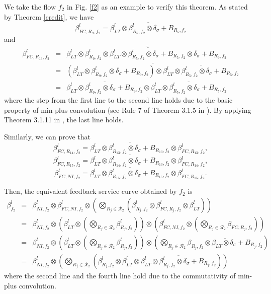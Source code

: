 \documentclass[preprint]{elsarticle}
\begin{document}
\begin{pf}
We take the flow $f_2$ in Fig. \ref{f2} as an example to verify this theorem. As stated by Theorem \ref{credit}, we have $$\beta_{FC,R_9,f_2}^l=\overline{\beta^l_{LT}\otimes\beta_{R_5,f_2}^l\otimes\delta_\sigma+B_{R_5,f_2}}$$ and
\begin{eqnarray*}
\beta_{FC,R_{13},f_2}^l&=&\overline{\beta^l_{LT}\otimes\beta^l_{R_9,f_2}\otimes\overline{\beta^l_{LT}\otimes\beta^l_{R_5,f_2}\otimes\delta_\sigma+B_{R_5,f_2}}\otimes\delta_\sigma+B_{R_9,f_2}}\label{eq1}\\
&=&\overline{(\beta^l_{LT}\otimes\beta^l_{R_9,f_2}\otimes\delta_\sigma+B_{R_9,f_2})\otimes\overline{\beta^l_{LT}\otimes\beta^l_{R_5,f_2}\otimes\delta_\sigma+B_{R_5,f_2}}}\label{eq2}\\
&=&\overline{\beta^l_{LT}\otimes\beta^l_{R_9,f_2}\otimes\delta_\sigma+B_{R_9,f_2}}\otimes\overline{\beta^l_{LT}\otimes\beta^l_{R_5,f_2}\otimes\delta_\sigma+B_{R_5,f_2}}\label{eq3}
\end{eqnarray*}
where the step from the first line to the second line holds due to the basic property of min-plus convolution (see Rule 7 of Theorem 3.1.5 in \cite{Boudec2001Network}). By applying Theorem 3.1.11 in \cite{Boudec2001Network}, the last line holds.

Similarly, we can prove that
$$\beta_{FC,R_{14},f_2}^l=\overline{\beta^l_{LT}\otimes\beta^l_{R_{13},f_2}\otimes\delta_\sigma+B_{R_{13},f_2}}\otimes\beta_{FC,R_{13},f_2}^l,$$
$$\beta_{FC,R_{15},f_2}^l=\overline{\beta^l_{LT}\otimes\beta^l_{R_{14},f_2}\otimes\delta_\sigma+B_{R_{13},f_2}}\otimes\beta_{FC,R_{14},f_2}^l,$$
$$\beta_{FC,NI,f_2}^l=\overline{\beta^l_{LT}\otimes\beta^l_{R_{15},f_2}\otimes\delta_\sigma+B_{R_{15},f_2}}\otimes\beta_{FC,R_{15},f_2}^l.$$

Then, the equivalent feedback service curve obtained by $f_2$ is
\begin{eqnarray*}
\beta_{f_2}^l&=&\beta_{NI,f_2}^l\otimes\beta_{FC,NI,f_2}^l\otimes(\underset{R_j\in\mathcal{R}_2}{\bigotimes}(\beta^l_{R_j,f_2}\otimes\beta^l_{FC,R_j,f_2}\otimes\beta_{LT}^l))\\
&=& \beta_{NI,f_2}^l\otimes(\beta_{LT}^l\otimes(\underset{R_j\in\mathcal{R}_2}{\bigotimes}\beta^l_{R_j,f_2}))\otimes(\beta_{FC,NI,f_2}^l\otimes(\underset{R_j\in\mathcal{R}_2}{\bigotimes}\beta_{FC,R_j,f_2}))\\
&=& \beta_{NI,f_2}^l\otimes(\beta_{LT}^l\otimes(\underset{R_j\in\mathcal{R}_2}{\bigotimes}\beta^l_{R_j,f_2}))\otimes(\underset{R_j\in\mathcal{R}_2}{\bigotimes}\overline{\beta_{R_j,f_2}\otimes\beta_{LT}\otimes\delta_\sigma+B_{R_j,f_2}})\\
&=& \beta_{NI,f_2}^l\otimes(\underset{R_j\in\mathcal{R}_2}{\bigotimes}(\beta^l_{R_j,f_2}\otimes\beta_{LT}^l\otimes\overline{\beta^l_{LT}\otimes\beta^l_{R_{j},f_2}\otimes\delta_\sigma+B_{R_j,f_2}}))
\end{eqnarray*}
where the second line and the fourth line hold due to the commutativity of min-plus convolution.


\end{pf}
\end{document}
